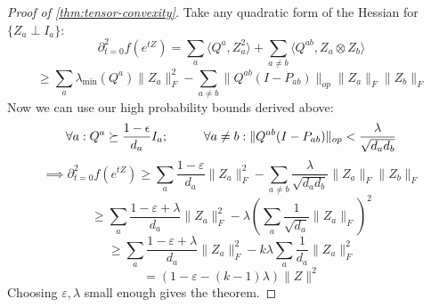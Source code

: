 \documentclass{article}
\newcommand\eps{\varepsilon}
\begin{document}
\begin{proof} [Proof of \cref{thm:tensor-convexity}]
Take any quadratic form of the Hessian for $\{Z_{a} \perp I_{a}\}$:
\[ \partial_{t=0}^{2} f(e^{t Z}) = \sum_{a} \langle Q^{a}, Z_{a}^{2} \rangle + \sum_{a \neq b} \langle Q^{ab}, Z_{a} \otimes Z_{b} \rangle   \]
\[ \geq \sum_{a} \lambda_{\min}(Q^{a}) \|Z_{a}\|_{F}^{2} - \sum_{a \neq b} \|Q^{ab} (I-P_{ab})\|_{op} \|Z_{a}\|_{F} \|Z_{b}\|_{F}    \]
Now we can use our high probability bounds derived above:
\[ \forall a: Q^{a} \succeq \frac{1-\epsilon}{d_{a}} I_{a}; \hspace{10mm}
\forall a \neq b: \|Q^{ab} (I-P_{ab})\|_{op} < \frac{\lambda}{\sqrt{d_{a} d_{b}}}   \]
\[ \implies \partial_{t=0}^{2} f(e^{t Z}) \geq \sum_{a} \frac{1-\eps}{d_{a}} \|Z_{a}\|_{F}^{2} - \sum_{a \neq b} \frac{\lambda}{\sqrt{d_{a} d_{b}}} \|Z_{a}\|_{F} \|Z_{b}\|_{F}  \]
\[ \geq \sum_{a} \frac{1-\eps+\lambda}{d_{a}} \|Z_{a}\|_{F}^{2} - \lambda \left( \sum_{a} \frac{1}{\sqrt{d_{a}}} \|Z_{a}\|_{F}   \right)^{2}   \]
\[ \geq \sum_{a} \frac{1-\eps+\lambda}{d_{a}} \|Z_{a}\|_{F}^{2} - k\lambda \sum_{a} \frac{1}{d_{a}} \|Z_{a}\|_{F}^{2} \]
\[ = (1-\eps-(k-1)\lambda) \|Z\|^{2}    \]
Choosing $\eps,\lambda$ small enough gives the theorem.
\end{proof}
\end{document}
